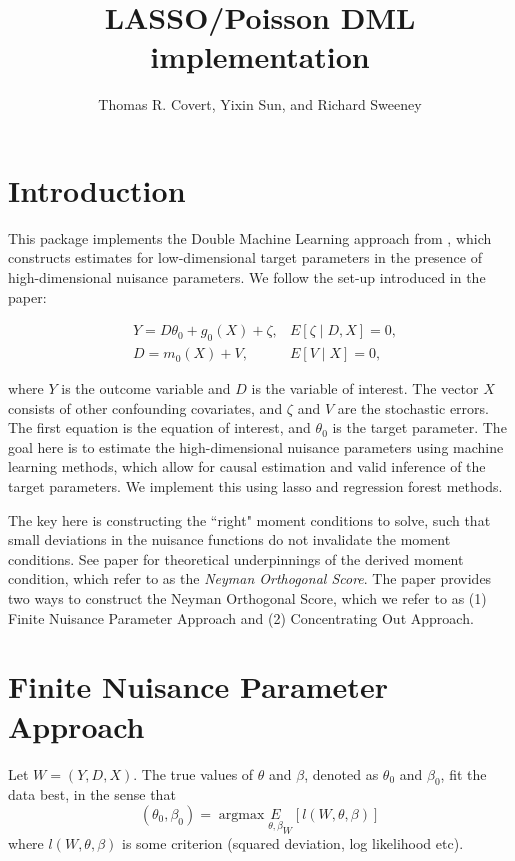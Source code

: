 \documentclass[11pt]{article}
\title{LASSO/Poisson DML implementation}
\author{Thomas R. Covert, Yixin Sun, and Richard Sweeney}
\DeclareMathOperator*{\argmax}{argmax}
\begin{document}
\maketitle

\tableofcontents

\section{Introduction}
This package implements the Double Machine Learning approach from \citet{chernozhukov_doubledebiased_2018}, which constructs estimates for low-dimensional target parameters in the presence of high-dimensional nuisance parameters. We follow the set-up introduced in the paper:

\begin{eqnarray}\label{eq: PL1}
    &  Y = D\theta_0 + g_0(X) + \zeta,  &  E[\zeta \mid D,X]= 0,\\
     & D = m_0(X) +  V,   &  E[V \mid X] = 0, \label{eq: PL3}
   \end{eqnarray}
   
where $Y$ is the outcome variable and $D$ is the variable of interest. The vector $X$ consists of other confounding covariates, and $\zeta$ and $V$ are the stochastic errors. The first equation is the equation of interest, and $\theta_0$ is the target parameter. The goal here is to estimate the high-dimensional nuisance parameters using machine learning methods, which allow for causal estimation and valid inference of the target parameters. We implement this using lasso and regression forest methods. 

The key here is constructing the ``right" moment conditions to solve, such that small deviations in the nuisance functions do not invalidate the moment conditions. See paper for theoretical underpinnings of the derived moment condition, which \citet{chernozhukov_doubledebiased_2018} refer to as the \textit{Neyman Orthogonal Score}. The paper provides two ways to construct the Neyman Orthogonal Score, which we refer to as (1) Finite Nuisance Parameter Approach and (2) Concentrating Out Approach. 


\section{Finite Nuisance Parameter Approach}
Let $W = (Y, D, X)$.  The true values of $\theta$ and $\beta$, denoted as $\theta_0$ and $\beta_0$, fit the data best, in the sense that
\begin{equation*}
	(\theta_0, \beta_0) = \argmax \underset{\theta, \beta} E_W\left[l(W, \theta, \beta)\right]
\end{equation*}
where $l(W, \theta, \beta)$ is some criterion (squared deviation, log likelihood etc).
\end{document}
